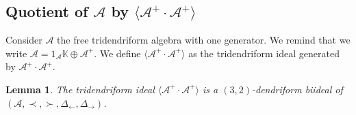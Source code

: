 \documentclass[10pt,a4paper]{amsart}
\numberwithin{equation}{section}
\theoremstyle{definition}
\theoremstyle{plain}
\newtheorem{Lemme}[defi]{Lemma}
\newcommand{\K}{\mathbb{K}}
\begin{document}
\subsection[Quotient of A by langle A\^{}+ cdot A\^{}+ rangle]{Quotient of $\boldsymbol{\mathcal{A}}$ by $\boldsymbol{\big\langle \mathcal{A}^+\cdot \mathcal{A}^+ \big\rangle}$}

Consider $\mathcal{A}$ the free tridendriform algebra with one generator. We remind that we write $\mathcal{A}=1_\mathcal{A}\K\oplus \mathcal{A}^+$.
We define $\big\langle \mathcal{A}^+\cdot \mathcal{A}^+ \big\rangle$ as the tridendriform ideal generated by $\mathcal{A}^+\cdot \mathcal{A}^+.$
\begin{Lemme}
	 The tridendriform ideal $\big\langle \mathcal{A}^+\cdot \mathcal{A}^+ \big\rangle$ is a $(3,2)$-dendriform biideal of $(\mathcal{A},\prec,\succ,\allowbreak \Delta_{\leftarrow},\Delta_{\rightarrow})$.
\end{Lemme}
\end{document}
